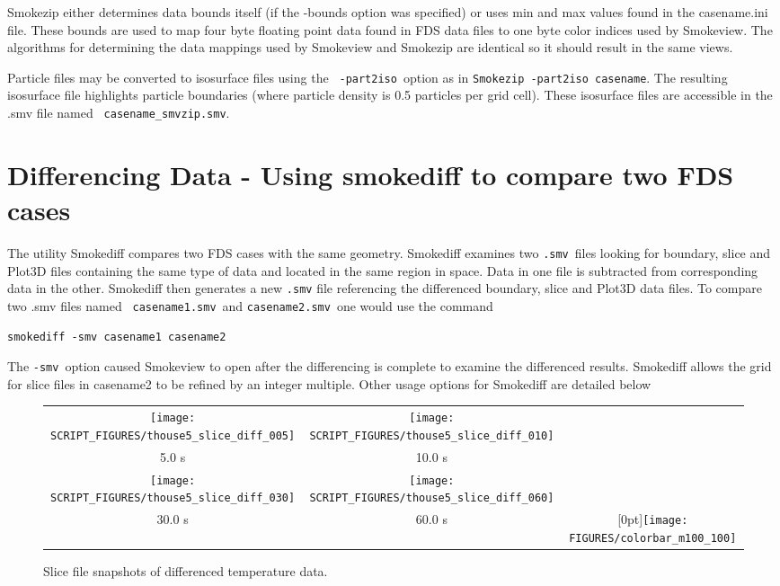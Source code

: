 \documentclass[11pt,twoside]{book}
\begin{document}


Smokezip either determines data bounds itself (if the -bounds option was specified)
or uses min and max values found in the casename.ini
file.  These bounds are used to map four byte floating point data
found in FDS data files to one byte color indices used by
Smokeview.  The algorithms for determining
the data mappings used by Smokeview and Smokezip are identical so it
should result in the same views.

Particle files may be converted to isosurface files using the {\tt
-part2iso}\ option as in {\tt Smokezip -part2iso casename}.  The
resulting isosurface file highlights particle boundaries (where
particle density is 0.5 particles per grid cell). These isosurface
files are accessible in the .smv file named {\tt
casename\_smvzip.smv}.

\section{Differencing Data - Using smokediff to compare two FDS cases}
\label{ch:smokediff}
The utility Smokediff compares two FDS cases with the same
geometry.  Smokediff examines two {\tt .smv}\ files looking for
boundary, slice and Plot3D files containing the same type of data
and located in the same region in space. Data in one file is subtracted from corresponding data in the
other.  Smokediff then generates a new {\tt .smv} file referencing the differenced boundary,
slice and Plot3D data files. To compare two .smv files named {\tt
casename1.smv}\ and {\tt casename2.smv}\ one would use the command

\begin{lstlisting}
smokediff -smv casename1 casename2
\end{lstlisting}

\noindent The {\tt -smv}\ option caused Smokeview to open after the differencing is complete to examine the differenced results.
Smokediff allows the grid for slice files in casename2 to be
refined by an integer multiple.  Other usage options for Smokediff are
detailed below



\begin{figure}[\figoptions]
\begin{center}
\begin{tabular}{ccc}
\texttt{[image: SCRIPT\_FIGURES/thouse5\_slice\_diff\_005]}&
\texttt{[image: SCRIPT\_FIGURES/thouse5\_slice\_diff\_010]}\\
5.0 s&10.0 s\\
\texttt{[image: SCRIPT\_FIGURES/thouse5\_slice\_diff\_030]}&
\texttt{[image: SCRIPT\_FIGURES/thouse5\_slice\_diff\_060]}\\
30.0 s&60.0 s
&\raisebox{0.0ex}[0pt]{\texttt{[image: FIGURES/colorbar\_m100\_100]}}\\
\end{tabular}
\end{center}
\caption [Slice file snapshots of differenced temperature data.]
{Slice file snapshots of differenced temperature data.}
\label{figdiffslice}%
\end{figure}
\end{document}
